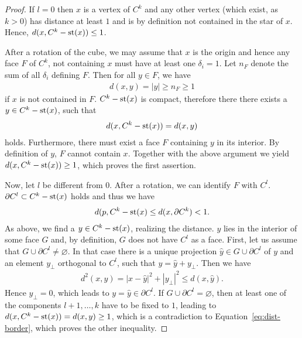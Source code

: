 \begin{proof}
  If \(l = 0\) then \(x\) is a vertex of \(C^k\) and any other vertex (which exist, as \(k > 0\)) has distance at least \(1\) and is by definition not contained in the star of \(x\). Hence, \(d(x, C^k - \operatorname{st}(x)) \leq 1\).
  
  After a rotation of the cube, we may assume that \(x\) is the origin and hence any face \(F\) of \(C^k\), not containing \(x\) must have at least one \(\delta_i = 1\). Let \(n_F\) denote the sum of all \(\delta_i\) defining \(F\). Then for all \(y \in F\), we have
  \begin{align*}
    d(x,y) = |y| \geq n_F \geq 1
  \end{align*}
  if \(x\) is not contained in \(F\). \(C^k - \operatorname{st}(x)\) is compact, therefore there there exists a \(y \in C^k - \operatorname{st}(x)\), such that
  \begin{align*}
    d(x, C^k - \operatorname{st}(x)) = d(x, y) 
  \end{align*}
  holds. Furthermore, there must exist a face \(F\) containing \(y\) in its interior. By definition of \(y\), \(F\) cannot contain \(x\). Together with the above argument we yield \(d(x, C^k - \operatorname{st}(x)) \geq 1\), which proves the first assertion.

  Now, let \(l\) be different from \(0\). After a rotation, we can identify \(F\) with \(C^l\). \(\partial C^l \subset C^k - \operatorname{st}(x)\) holds and thus we have
  \begin{align}
    \label{eq:dist-border}
    d(p, C^k - \operatorname{st}(x) \leq d(x, \partial C^k) < 1 .
  \end{align}
  As above, we find a \(y \in C^k - \operatorname{st}(x)\), realizing the distance. \(y\) lies in the interior of some face \(G\) and, by definition, \(G\) does not have \(C^l\) as a face. First, let us assume that \(G \cup \partial C^l \neq \varnothing\). In that case there is a unique projection \(\hat y \in G \cup \partial C^l\) of \(y\) and an element \(y_\perp\) orthogonal to \(C^l\), such that \(y = \hat y + y_\perp\). Then we have
  \begin{align*}
    d^2(x, y) = |x - \hat y|^2 + |y_\perp|^2 \leq d(x, \hat y).
  \end{align*}
  Hence \(y_\perp = 0\), which leads to \(y = \hat y \in \partial C^l\). If \(G \cup \partial C^l = \varnothing\), then at least one of the components \(l+1, \dots, k\) have to be fixed to \(1\), leading to \(d(x, C^k - \operatorname{st}(x)) = d(x,y) \geq 1\), which is a contradiction to Equation~\ref{eq:dist-border}, which proves the other inequality.
\end{proof}


